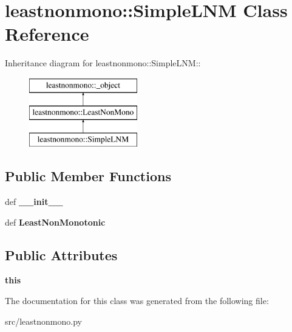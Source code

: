 \hypertarget{classleastnonmono_1_1SimpleLNM}{
\section{leastnonmono::SimpleLNM Class Reference}
\label{d8/df0/classleastnonmono_1_1SimpleLNM}
}
Inheritance diagram for leastnonmono::SimpleLNM::\begin{figure}[H]
\begin{center}
\leavevmode
\includegraphics[height=3cm]{d8/df0/classleastnonmono_1_1SimpleLNM}
\end{center}
\end{figure}
\subsection*{Public Member Functions}
\begin{DoxyCompactItemize}
\item 
\hypertarget{classleastnonmono_1_1SimpleLNM_a60b4300be3d34df4505fa4a58eb214dd}{
def {\bfseries \_\-\_\-init\_\-\_\-}}
\label{d8/df0/classleastnonmono_1_1SimpleLNM_a60b4300be3d34df4505fa4a58eb214dd}

\item 
\hypertarget{classleastnonmono_1_1SimpleLNM_ac5c0bed3e296b52b508ad9f45860ac75}{
def {\bfseries LeastNonMonotonic}}
\label{d8/df0/classleastnonmono_1_1SimpleLNM_ac5c0bed3e296b52b508ad9f45860ac75}

\end{DoxyCompactItemize}
\subsection*{Public Attributes}
\begin{DoxyCompactItemize}
\item 
\hypertarget{classleastnonmono_1_1SimpleLNM_a0e7014df02df6a20c4a5d1a78e574303}{
{\bfseries this}}
\label{d8/df0/classleastnonmono_1_1SimpleLNM_a0e7014df02df6a20c4a5d1a78e574303}

\end{DoxyCompactItemize}


The documentation for this class was generated from the following file:\begin{DoxyCompactItemize}
\item 
src/leastnonmono.py\end{DoxyCompactItemize}
